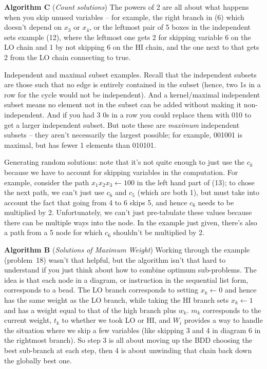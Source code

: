  {\bf Algorithm C} ({\it Count solutions})\hfil\break
The powers of 2 are all about what happens when you skip unused
variables -- for example, the right branch in (6) which doesn't depend
on $x_3$ or $x_4$, or the leftmost pair of 5 boxes in the independent
sets example (12), where the leftmost one gets 2 for skipping variable 6
on the LO chain and 1 by not skipping 6 on the HI chain, and the one
next to that gets 2 from the LO chain connecting to true.

 Independent and maximal subset examples.\hfil\break
Recall that the independent subsets are those such that
no edge is entirely contained in the subset (hence, two 1s in a row
for the cycle would not be independent).  And a kernel/maximal
independent subset means no element not in the subset can be
added without making it non-independent.   And if you had 3 0s in 
a row you could replace them with 010 to get a larger independent
subset.  But note these are {\it maximum} independent subsets -- 
they aren't necessarily the largest possible; for example, 001001
is maximal, but has fewer 1 elements than 010101.

 Generating random solutions: note that
it's not quite enough to just use the $c_k$ because we have
to account for skipping variables in the computation.  For example,
consider the path $x_1 x_2 x_3 \gets 1 0 0$ in the left hand part
of (13); to chose the next path, we can't just use $c_6$ and $c_5$
(which are both 1), but must take into account the fact that
going from 4 to 6 skips 5, and hence $c_6$ needs to be multiplied
by 2.  Unfortunately, we can't just pre-tabulate these values because
there can be multiple ways into the node.  In the example just given,
there's also a path from a 5 node for which $c_6$ shouldn't be multiplied
by 2.

 {\bf Algorithm B} ({\it Solutions of Maximum Weight})\hfil\break
Working through the example (problem~18) wasn't that helpful, but the
algorithm isn't that hard to understand if you just think about how to
combine optimum sub-problems.  The idea is that each node in a diagram,
or instruction in the sequential list form, corresponds to a bead.
The LO branch corresponds to setting $x_k \gets 0$ and hence
has the same weight as the LO branch, while taking the HI branch
sets $x_k \gets 1$ and has a weight equal to that of the high branch
plus $w_k$.  $m_k$ corresponds to the current weight, $t_k$ to
whether we took LO or HI, and $W_i$ provides a way to handle
the situation where we skip a few variables (like skipping 3 and 4
in diagram 6 in the rightmost branch).  So step 3 is all about moving up
the BDD choosing the best sub-branch at each step, then 4 is about
unwinding that chain back down the globally best one.

